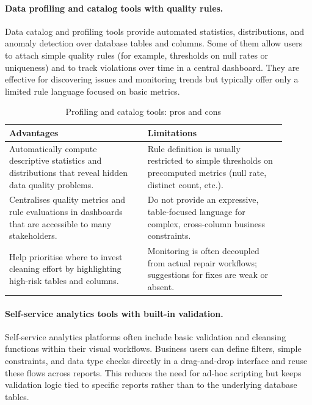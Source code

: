 \paragraph{Data profiling and catalog tools with quality rules.}
Data catalog and profiling tools provide automated statistics, distributions, and anomaly detection over database tables and columns. 
Some of them allow users to attach simple quality rules (for example, thresholds on null rates or uniqueness) and to track violations over time in a central dashboard. 
They are effective for discovering issues and monitoring trends but typically offer only a limited rule language focused on basic metrics.

\begin{table}[h]
\centering
\caption{Profiling and catalog tools: pros and cons}
\begin{tabular}{|p{0.45\linewidth}| p{0.45\linewidth}|}
\hline
\textbf{Advantages} & \textbf{Limitations} \\
\hline
Automatically compute descriptive statistics and distributions that reveal hidden data quality problems. &
Rule definition is usually restricted to simple thresholds on precomputed metrics (null rate, distinct count, etc.). \\
Centralises quality metrics and rule evaluations in dashboards that are accessible to many stakeholders. &
Do not provide an expressive, table-focused language for complex, cross-column business constraints. \\
Help prioritise where to invest cleaning effort by highlighting high-risk tables and columns. &
Monitoring is often decoupled from actual repair workflows; suggestions for fixes are weak or absent. \\
\hline
\end{tabular}
\end{table}

\paragraph{Self-service analytics tools with built-in validation.}
Self-service analytics platforms often include basic validation and cleansing functions within their visual workflows. 
Business users can define filters, simple constraints, and data type checks directly in a drag-and-drop interface and reuse these flows across reports. 
This reduces the need for ad-hoc scripting but keeps validation logic tied to specific reports rather than to the underlying database tables.

